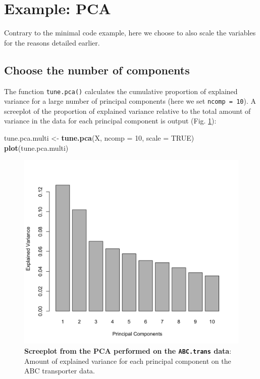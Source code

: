 \documentclass[]{book}
\newenvironment{Shaded}{\begin{snugshade}}{\end{snugshade}}
\newcommand{\DataTypeTok}[1]{\textcolor[rgb]{0.13,0.29,0.53}{#1}}
\newcommand{\DecValTok}[1]{\textcolor[rgb]{0.00,0.00,0.81}{#1}}
\newcommand{\KeywordTok}[1]{\textcolor[rgb]{0.13,0.29,0.53}{\textbf{#1}}}
\newcommand{\NormalTok}[1]{#1}
\newcommand{\OtherTok}[1]{\textcolor[rgb]{0.56,0.35,0.01}{#1}}
\newcommand{\StringTok}[1]{\textcolor[rgb]{0.31,0.60,0.02}{#1}}
\begin{document}
\hypertarget{pca:ex}{%
\section{Example: PCA}\label{pca:ex}}

Contrary to the minimal code example, here we choose to also scale the variables for the reasons detailed earlier.

\hypertarget{optimal-param-choice}{%
\subsection{Choose the number of components}\label{optimal-param-choice}}

The function \texttt{tune.pca()} calculates the cumulative proportion of explained variance for a large number of principal components (here we set \texttt{ncomp\ =\ 10}). A screeplot of the proportion of explained variance relative to the total amount of variance in the data for each principal component is output (Fig. \ref{fig:screeplot-fig}):

\begin{Shaded}
\begin{Highlighting}[]
\NormalTok{tune.pca.multi <-}\StringTok{ }\KeywordTok{tune.pca}\NormalTok{(X, }\DataTypeTok{ncomp =} \DecValTok{10}\NormalTok{, }\DataTypeTok{scale =} \OtherTok{TRUE}\NormalTok{)}
\KeywordTok{plot}\NormalTok{(tune.pca.multi)}
\end{Highlighting}
\end{Shaded}

\begin{figure}

{\centering \includegraphics[width=0.5\linewidth]{Figures/PCA/screeplot-fig-1} 

}

\caption{\textbf{Screeplot from the PCA performed on the \texttt{ABC.trans} data}: Amount of explained variance for each principal component on the ABC transporter data.}\label{fig:screeplot-fig}
\end{figure}
\end{document}
